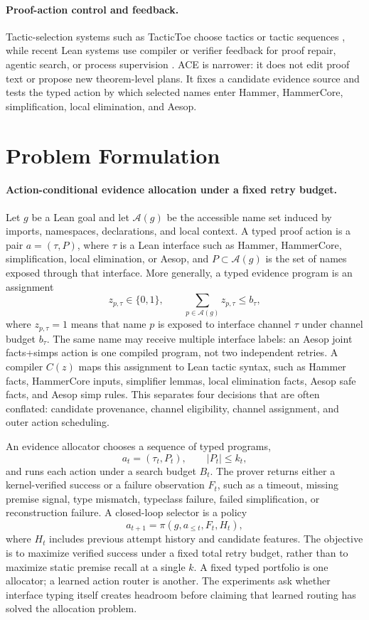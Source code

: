 \documentclass{article}
\newcommand{\tap}{\textsc{ACE}}
\begin{document}
\paragraph{Proof-action control and feedback.}
Tactic-selection systems such as TacticToe choose tactics or tactic sequences \citep{gauthier2021tactictoe}, while recent Lean systems use compiler or verifier feedback for proof repair, agentic search, or process supervision \citep{wang2026repairlean,ospanov2025apollo,ma2026oprover,kim2026process,huang2025leanprogress,hu2024minictx}. \tap{} is narrower: it does not edit proof text or propose new theorem-level plans. It fixes a candidate evidence source and tests the typed action by which selected names enter Hammer, HammerCore, simplification, local elimination, and Aesop.

\section{Problem Formulation}

\paragraph{Action-conditional evidence allocation under a fixed retry budget.}
Let $g$ be a Lean goal and let $\mathcal{A}(g)$ be the accessible name set induced by imports, namespaces, declarations, and local context. A typed proof action is a pair $a=(\tau,P)$, where $\tau$ is a Lean interface such as Hammer, HammerCore, simplification, local elimination, or Aesop, and $P\subset \mathcal{A}(g)$ is the set of names exposed through that interface. More generally, a typed evidence program is an assignment
\[
z_{p,\tau}\in\{0,1\}, \qquad \sum_{p\in\mathcal{A}(g)} z_{p,\tau}\le b_\tau,
\]
where $z_{p,\tau}=1$ means that name $p$ is exposed to interface channel $\tau$ under channel budget $b_\tau$. The same name may receive multiple interface labels: an Aesop joint facts+simps action is one compiled program, not two independent retries. A compiler $C(z)$ maps this assignment to Lean tactic syntax, such as Hammer facts, HammerCore inputs, simplifier lemmas, local elimination facts, Aesop safe facts, and Aesop simp rules. This separates four decisions that are often conflated: candidate provenance, channel eligibility, channel assignment, and outer action scheduling.

An evidence allocator chooses a sequence of typed programs,
\[
a_t=(\tau_t,P_t), \qquad |P_t| \le k_t,
\]
and runs each action under a search budget $B_t$. The prover returns either a kernel-verified success or a failure observation $F_t$, such as a timeout, missing premise signal, type mismatch, typeclass failure, failed simplification, or reconstruction failure. A closed-loop selector is a policy
\[
a_{t+1} = \pi(g, a_{\le t}, F_t, H_t),
\]
where $H_t$ includes previous attempt history and candidate features. The objective is to maximize verified success under a fixed total retry budget, rather than to maximize static premise recall at a single $k$. A fixed typed portfolio is one allocator; a learned action router is another. The experiments ask whether interface typing itself creates headroom before claiming that learned routing has solved the allocation problem.
\end{document}
